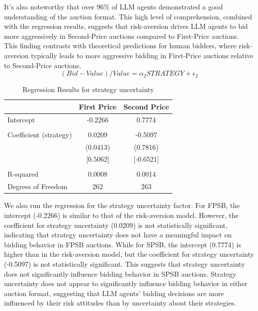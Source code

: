 \documentclass{article} %
\begin{document}
It's also noteworthy that over 96\% of LLM agents demonstrated a good understanding of the auction format. 
This high level of comprehension, combined with the regression results, suggests that risk-aversion drives LLM agents to bid more aggressively in Second-Price auctions compared to First-Price auctions. 
This finding contrasts with theoretical predictions for human bidders, where risk-aversion typically leads to more aggressive bidding in First-Price auctions relative to Second-Price auctions.
\begin{equation}
    (Bid-Value)/Value = \alpha_2 STRATEGY + \epsilon_2
\end{equation}
\begin{table}[htbp]
\centering
\begin{tabular}{lcc}
\hline
 & First Price & Second Price \\
\hline
Intercept & -0.2266 & 0.7774 \\
 & & \\
Coefficient (strategy) & 0.0209 & -0.5097 \\
 & (0.0413) & (0.7816) \\
 & [0.5062] & [-0.6521] \\
 & & \\
R-squared & 0.0008 & 0.0014 \\
Degrees of Freedom & 262 & 263 \\
\hline
\end{tabular}
\caption{Regression Results for strategy uncertainty}
\label{tab:regression_results}
\end{table}

We also run the regression for the strategy uncertainty factor.
For FPSB, the intercept (-0.2266) is similar to that of the risk-aversion model. 
However, the coefficient for strategy uncertainty (0.0209) is not statistically significant, indicating that strategy uncertainty does not have a meaningful impact on bidding behavior in FPSB auctions. 
While for SPSB, the intercept (0.7774) is higher than in the risk-aversion model, but the coefficient for strategy uncertainty (-0.5097) is not statistically significant. 
This suggests that strategy uncertainty does not significantly influence bidding behavior in SPSB auctions.
Strategy uncertainty does not appear to significantly influence bidding behavior in either auction format, suggesting that LLM agents' bidding decisions are more influenced by their risk attitudes than by uncertainty about their strategies.
\end{document}
